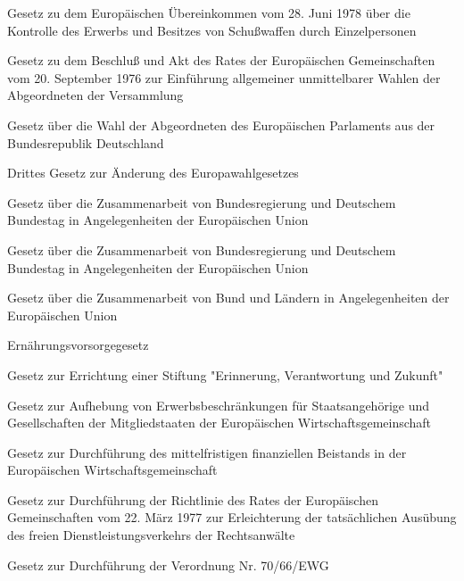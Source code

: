 \item[{EuWaffKontrÜbkG}] Gesetz zu dem Europäischen Übereinkommen vom 28. Juni 1978 über die Kontrolle des Erwerbs und Besitzes von Schußwaffen durch Einzelpersonen

\item[{EuWAktG}] Gesetz zu dem Beschluß und Akt des Rates der Europäischen Gemeinschaften vom 20. September 1976 zur Einführung allgemeiner unmittelbarer Wahlen der Abgeordneten der Versammlung

\item[{EuWG}] Gesetz über die Wahl der Abgeordneten des Europäischen Parlaments aus der Bundesrepublik Deutschland

\item[{EuWGÄndG-3}] Drittes Gesetz zur Änderung des Europawahlgesetzes

\item[{EUZBBG}] Gesetz über die Zusammenarbeit von Bundesregierung und Deutschem Bundestag in Angelegenheiten der Europäischen Union

\item[{EUZBBG-2013}] Gesetz über die Zusammenarbeit von Bundesregierung und Deutschem Bundestag in Angelegenheiten der Europäischen Union

\item[{EUZBLG}] Gesetz über die Zusammenarbeit von Bund und Ländern in Angelegenheiten der Europäischen Union

\item[{EVG}] Ernährungsvorsorgegesetz

\item[{EVZStiftG}] Gesetz zur Errichtung einer Stiftung "Erinnerung, Verantwortung und Zukunft"

\item[{EWGEBeschrAufhG}] Gesetz zur Aufhebung von Erwerbsbeschränkungen für Staatsangehörige und Gesellschaften der Mitgliedstaaten der Europäischen Wirtschaftsgemeinschaft

\item[{EWGFinBeistG}] Gesetz zur Durchführung des mittelfristigen finanziellen Beistands in der Europäischen Wirtschaftsgemeinschaft

\item[{EWGRL249-77DG}] Gesetz zur Durchführung der Richtlinie des Rates der Europäischen Gemeinschaften vom 22. März 1977 zur Erleichterung der tatsächlichen Ausübung des freien Dienstleistungsverkehrs der Rechtsanwälte

\item[{EWGV70-66DG}] Gesetz zur Durchführung der Verordnung Nr. 70/66/EWG

